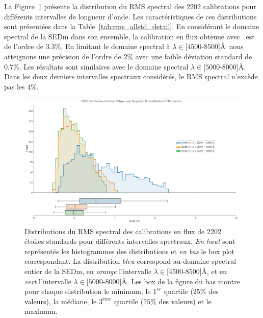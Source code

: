 \documentclass[../main/main.tex]{subfiles}
\begin{document}
La Figure~\ref{fig:rms_allstd} présente la distribution du RMS spectral
des $2202$ calibrations 
pour différents intervalles de longueur d'onde. Les caractéristiques de
ces distributions sont présentées dans la Table~\ref{tab:rms_allstd_detail}. En
considérant le domaine spectral de la SEDm dans son ensemble, la
calibration en flux obtenue avec \hypergal\ est de l'ordre de $3.3\%$. En
limitant le domaine spectral à $\lambda\in$[$4500$-$8500$]\AA\, nous
atteignons une précision de l'ordre de $2\%$ avec une faible déviation
standard de $0.7\%$. Les résultats sont similaires avec le domaine
spectral $\lambda\in$[$5000$-$8000$]\AA. Dans les deux derniers
intervalles spectraux considérés, le RMS spectral n'excède pas les $4\%$. 

\begin{figure}[ht]
  \centering
  \includegraphics[width=0.99\textwidth]{../figures/06_irf/rmsallstd_fluxcalibration.pdf}
  \caption[Distributions du RMS spectral des
  calibrations en flux pour différents intervalles spectraux]{Distributions du RMS spectral des
  calibrations en flux de 2202 étoiles standards pour différents
  intervalles spectraux. \emph{En haut} sont représentés les
  histogrammes des distributions et \emph{en bas} le box plot
  correspondant. La distribution \emph{bleu} correspond au domaine
  spectral entier de la SEDm, en \emph{orange} l'intervalle
  $\lambda\in$[$4500$-$8500$]\AA, et en \emph{vert} l'intervalle
  $\lambda\in$[$5000$-$8000$]\AA. Les box de la figure du bas montre
  pour chaque distribution le minimum, le $1^{er}$ quartile ($25\%$ des
  valeurs), la médiane, le $3^{ème}$ quartile ($75\%$ des
  valeurs) et le maximum.}
  \label{fig:rms_allstd}
\end{figure}
\end{document}
